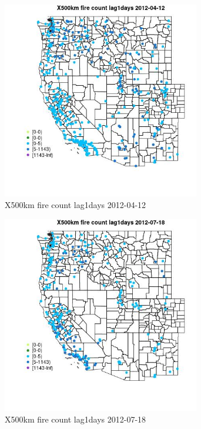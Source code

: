 \begin{figure} 
\centering  
\includegraphics[width=0.77\textwidth]{Code_Outputs/Report_ML_input_PM25_Step4_part_e_de_duplicated_aves_compiled_2019-05-14wNAs_MapObsX500km_fire_count_lag1days2012-04-12.jpg} 
\caption{\label{fig:Report_ML_input_PM25_Step4_part_e_de_duplicated_aves_compiled_2019-05-14wNAsMapObsX500km_fire_count_lag1days2012-04-12}X500km fire count lag1days 2012-04-12} 
\end{figure} 
 

\clearpage 

\begin{figure} 
\centering  
\includegraphics[width=0.77\textwidth]{Code_Outputs/Report_ML_input_PM25_Step4_part_e_de_duplicated_aves_compiled_2019-05-14wNAs_MapObsX500km_fire_count_lag1days2012-07-18.jpg} 
\caption{\label{fig:Report_ML_input_PM25_Step4_part_e_de_duplicated_aves_compiled_2019-05-14wNAsMapObsX500km_fire_count_lag1days2012-07-18}X500km fire count lag1days 2012-07-18} 
\end{figure} 
 

